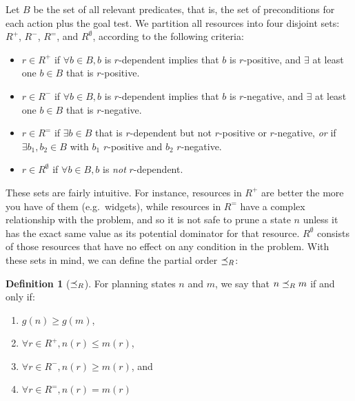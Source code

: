 \documentclass[letterpaper]{article}
\theoremstyle{plain} \newtheorem{theorem}{Theorem} \newtheorem{proposition}{Proposition} \newtheorem{lemma}{Lemma}
\theoremstyle{definition} \newtheorem{definition}{Definition} \newtheorem{conjecture}{Conjecture} \newtheorem*{example}{Example}
\theoremstyle{remark} \newtheorem*{remark}{Remark} \newtheorem*{note}{Note} \newtheorem{case}{Case}
\begin{document}
Let $B$ be the set of all relevant predicates, that is, the set of preconditions for each action plus the goal test. We partition all resources into four disjoint sets: $R^+$, $R^-$, $R^=$, and $R^\emptyset$, according to the following criteria:
\begin{itemize}
	\item $r \in R^+$ if $\forall b \in B, b$ is $r$-dependent implies that $b$ is $r$-positive, and $\exists$ at least one $b \in B$ that is $r$-positive.
	\item $r \in R^-$ if $\forall b \in B, b$ is $r$-dependent implies that $b$ is $r$-negative, and $\exists$ at least one $b \in B$ that is $r$-negative.
	\item $r \in R^=$ if $\exists b \in B$ that is $r$-dependent but not $r$-positive or $r$-negative, \emph{or} if $\exists b_1, b_2 \in B$ with $b_1$ $r$-positive and $b_2$ $r$-negative.
	\item $r \in R^\emptyset$ if $\forall b \in B, b$ is \emph{not} $r$-dependent.
\end{itemize}

These sets are fairly intuitive. For instance, resources in
$R^+$ are better the more you have of them (e.g.\ widgets),
while resources in $R^=$ have a complex relationship with
the problem, and so it is not safe to prune a state $n$ unless
it has the exact same value as its potential dominator for that
resource.  $R^\emptyset$ consists of those resources that
have no effect on any condition in the problem. With these sets
in mind, we can define the partial order $\preceq_R$:

\begin{definition}[$\preceq_R$]
	\label{def-po}
	For planning states $n$ and $m$, we say that $n \preceq_R m$ if and only if:
	\begin{enumerate}
		\item $g(n) \ge g(m)$,
		\item $\forall r \in R^+, n(r) \le m(r)$,
		\item $\forall r \in R^-, n(r) \ge m(r)$, and
		\item $\forall r \in R^=, n(r) = m(r)$
	\end{enumerate}
\end{definition}
\end{document}
